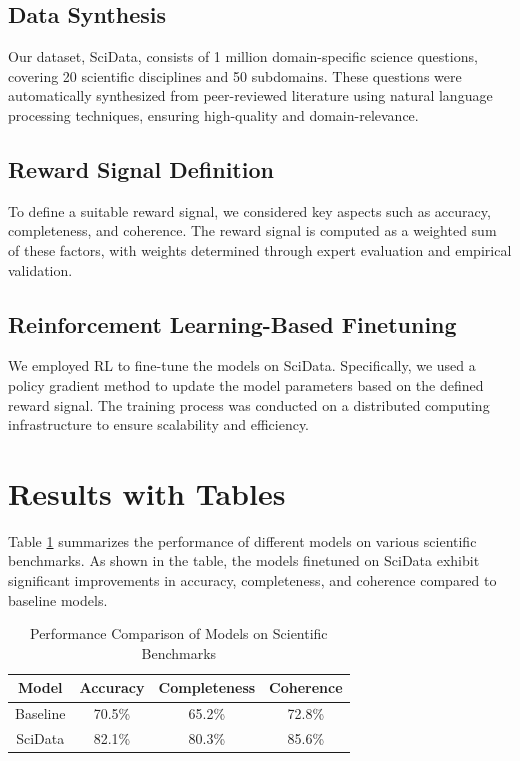 \documentclass{article}
\begin{document}
\subsection{Data Synthesis}
Our dataset, SciData, consists of 1 million domain-specific science questions, covering 20 scientific disciplines and 50 subdomains. These questions were automatically synthesized from peer-reviewed literature using natural language processing techniques, ensuring high-quality and domain-relevance.

\subsection{Reward Signal Definition}
To define a suitable reward signal, we considered key aspects such as accuracy, completeness, and coherence. The reward signal is computed as a weighted sum of these factors, with weights determined through expert evaluation and empirical validation.

\subsection{Reinforcement Learning-Based Finetuning}
We employed RL to fine-tune the models on SciData. Specifically, we used a policy gradient method to update the model parameters based on the defined reward signal. The training process was conducted on a distributed computing infrastructure to ensure scalability and efficiency.

\section{Results with Tables}
Table \ref{tab:results} summarizes the performance of different models on various scientific benchmarks. As shown in the table, the models finetuned on SciData exhibit significant improvements in accuracy, completeness, and coherence compared to baseline models.

\begin{table}[ht]
\centering
\caption{Performance Comparison of Models on Scientific Benchmarks}
\label{tab:results}
\begin{tabular}{|c|c|c|c|}
\hline
\textbf{Model} & \textbf{Accuracy} & \textbf{Completeness} & \textbf{Coherence} \\
\hline
Baseline & 70.5\% & 65.2\% & 72.8\% \\
SciData & 82.1\% & 80.3\% & 85.6\% \\
\hline
\end{tabular}
\end{table}
\end{document}
